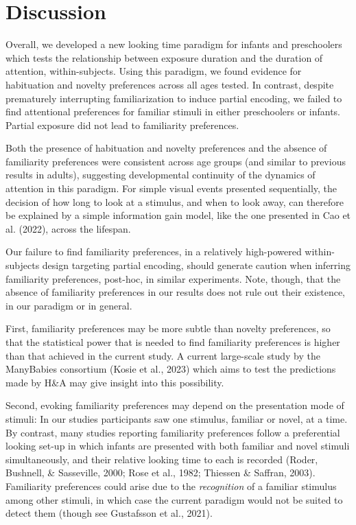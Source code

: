 \documentclass[10pt, letterpaper]{article}
\begin{document}
\hypertarget{discussion}{%
\section{Discussion}\label{discussion}}

Overall, we developed a new looking time paradigm for infants and
preschoolers which tests the relationship between exposure duration and
the duration of attention, within-subjects. Using this paradigm, we
found evidence for habituation and novelty preferences across all ages
tested. In contrast, despite prematurely interrupting familiarization to
induce partial encoding, we failed to find attentional preferences for
familiar stimuli in either preschoolers or infants. Partial exposure did
not lead to familiarity preferences.

Both the presence of habituation and novelty preferences and the absence
of familiarity preferences were consistent across age groups (and
similar to previous results in adults), suggesting developmental
continuity of the dynamics of attention in this paradigm. For simple
visual events presented sequentially, the decision of how long to look
at a stimulus, and when to look away, can therefore be explained by a
simple information gain model, like the one presented in Cao et al.
(2022), across the lifespan.

Our failure to find familiarity preferences, in a relatively
high-powered within-subjects design targeting partial encoding, should
generate caution when inferring familiarity preferences, post-hoc, in
similar experiments. Note, though, that the absence of familiarity
preferences in our results does not rule out their existence, in our
paradigm or in general.

First, familiarity preferences may be more subtle than novelty
preferences, so that the statistical power that is needed to find
familiarity preferences is higher than that achieved in the current
study. A current large-scale study by the ManyBabies consortium (Kosie
et al., 2023) which aims to test the predictions made by H\&A may give
insight into this possibility.

Second, evoking familiarity preferences may depend on the presentation
mode of stimuli: In our studies participants saw one stimulus, familiar
or novel, at a time. By contrast, many studies reporting familiarity
preferences follow a preferential looking set-up in which infants are
presented with both familiar and novel stimuli simultaneously, and their
relative looking time to each is recorded (Roder, Bushnell, \&
Sasseville, 2000; Rose et al., 1982; Thiessen \& Saffran, 2003).
Familiarity preferences could arise due to the \emph{recognition} of a
familiar stimulus among other stimuli, in which case the current
paradigm would not be suited to detect them (though see Gustafsson et
al., 2021).
\end{document}
